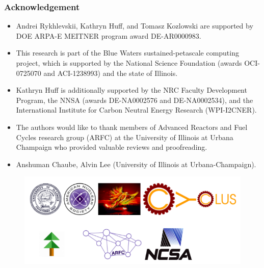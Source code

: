\begin{frame}
\frametitle{Acknowledgement}
\begin{itemize}
	\item Andrei Rykhlevskii, Kathryn Huff, and Tomasz 	Kozlowski are 
	supported by DOE ARPA-E MEITNER program award DE-AR0000983.
	\item This research is part of the Blue Waters sustained-petascale 
	computing project, which is supported by the National Science Foundation 
	(awards OCI-0725070 and ACI-1238993) and the state of Illinois.
	\item Kathryn Huff is additionally supported by the NRC Faculty 
	Development Program, the NNSA (awards DE-NA0002576 and DE-NA0002534), and 
	the International Institute for Carbon Neutral Energy Research 
	(WPI-I2CNER).
	\item The authors would like to thank  members of Advanced Reactors and 
	Fuel Cycles	research group (ARFC) at the University of Illinois at Urbana 
	Champaign who provided valuable reviews and proofreading.
	\item Anshuman Chaube, Alvin Lee (University of Illinois at 
	Urbana-Champaign).
\end{itemize}
\begin{figure}[t]
	\hspace*{-0.4in}
	\includegraphics[height=0.25\textheight]{./images/acks.png}
\end{figure}
\end{frame}